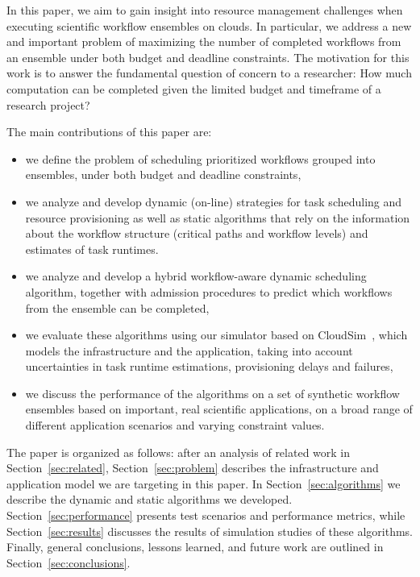 \documentclass[conference]{IEEEtran}
\begin{document}
In this paper, we aim to gain insight into resource management challenges when
executing scientific workflow ensembles on clouds. In particular, we address a
new and important problem of maximizing the number of completed workflows from
an ensemble under both budget and deadline constraints. The motivation for this
work is to answer the fundamental question of concern to a researcher: How much
computation can be completed given the limited budget and timeframe of a
research project? 

The main contributions of this paper are:
\begin{itemize}
  \item we define the problem of scheduling prioritized workflows grouped
  into ensembles, under both budget and deadline constraints,
  \item we analyze and develop dynamic (on-line) strategies for task scheduling
  and resource provisioning as well as static algorithms that
  rely on the information about the workflow structure (critical paths and
  workflow levels) and estimates of task runtimes. 
  \item we analyze and develop a hybrid workflow-aware dynamic scheduling
  algorithm, together with admission procedures to predict which workflows from
  the ensemble can be completed,
  \item we evaluate these algorithms using our simulator based on
  CloudSim~\cite{Calheiros2011}, which models the infrastructure and the application, 
  taking into account uncertainties in task runtime
  estimations, provisioning delays and failures, 
  \item we discuss the performance of the algorithms on a set of
  synthetic workflow ensembles based on important, real scientific
  applications, on a broad range of different application scenarios and
  varying constraint values.
\end{itemize}



The paper is organized as follows: after an analysis of related work in
Section~\ref{sec:related}, Section~\ref{sec:problem} describes the
infrastructure and application model we are targeting in this paper. In
Section~\ref{sec:algorithms} we describe the dynamic and static algorithms we
developed. Section~\ref{sec:performance} presents test scenarios and performance
metrics, while Section~\ref{sec:results} discusses the results of simulation
studies of these algorithms. Finally, general conclusions, lessons learned, and
future work are outlined in Section~\ref{sec:conclusions}.
\end{document}
